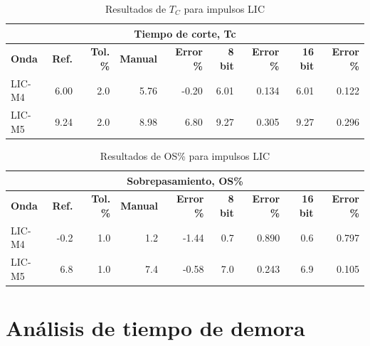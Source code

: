 \begin{table}[H]
    \centering
    \begin{tabular}{@{}lrrrrrrrr@{}}
        \toprule
        \multicolumn{9}{c}{\textbf{Tiempo de corte, Tc}}                                                                                                                  \\ \midrule
        \textbf{Onda} & \textbf{Ref.} & \textbf{Tol. \%} & \textbf{Manual} & \textbf{Error \%} & \textbf{8 bit} & \textbf{Error \%} & \textbf{16 bit} & \textbf{Error \%} \\ \midrule
        LIC-M4        & 6.00          & 2.0              & 5.76            & -0.20             & 6.01           & 0.134             & 6.01            & 0.122             \\ \midrule
        LIC-M5        & 9.24          & 2.0              & 8.98            & 6.80              & 9.27           & 0.305             & 9.27            & 0.296             \\ \bottomrule
    \end{tabular}
    \caption{Resultados de $T_C$ para impulsos LIC}
    \label{tab:resultados_tc_lic}
\end{table}

\begin{table}[H]
    \centering
    \begin{tabular}{@{}lrrrrrrrr@{}}
        \toprule
        \multicolumn{9}{c}{\textbf{Sobrepasamiento, OS\%}}                                                                                                                \\ \midrule
        \textbf{Onda} & \textbf{Ref.} & \textbf{Tol. \%} & \textbf{Manual} & \textbf{Error \%} & \textbf{8 bit} & \textbf{Error \%} & \textbf{16 bit} & \textbf{Error \%} \\ \midrule
        LIC-M4        & -0.2          & 1.0              & 1.2             & -1.44             & 0.7            & 0.890             & 0.6             & 0.797             \\ \midrule
        LIC-M5        & 6.8           & 1.0              & 7.4             & -0.58             & 7.0            & 0.243             & 6.9             & 0.105             \\ \bottomrule
    \end{tabular}
    \caption{Resultados de OS\% para impulsos LIC}
    \label{tab:resultados_os_lic}
\end{table}

\section{Análisis de tiempo de demora}
\label{sec:analisis_tiempo}

